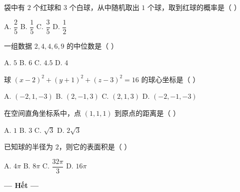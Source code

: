 \documentclass[11pt, a4paper]{article}
\begin{document}
\begin{baitap}[44]
袋中有 $2$ 个红球和 $3$ 个白球，从中随机取出 $1$ 个球，取到红球的概率是（ ）
\par\vspace{3pt}
\noindent A. $\dfrac{2}{5}$ \quad B. $\dfrac{1}{5}$ \quad C. $\dfrac{3}{5}$ \quad D. $\dfrac{1}{2}$
\end{baitap}

\begin{baitap}[45]
一组数据 $2, 4, 4, 6, 9$ 的中位数是（ ）
\par\vspace{3pt}
\noindent A. $5$ \quad B. $6$ \quad C. $4.5$ \quad D. $4$
\end{baitap}

\begin{baitap}[46]
球 $(x - 2)^2 + (y + 1)^2 + (z - 3)^2 = 16$ 的球心坐标是（ ）
\par\vspace{3pt}
\noindent A. $(-2, 1, -3)$ \quad B. $(2, -1, 3)$ \quad C. $(2, 1, 3)$ \quad D. $(-2, -1, -3)$
\end{baitap}

\begin{baitap}[47]
在空间直角坐标系中，点 $(1, 1, 1)$ 到原点的距离是（ ）
\par\vspace{3pt}
\noindent A. $1$ \quad B. $3$ \quad C. $\sqrt{3}$ \quad D. $2\sqrt{3}$
\end{baitap}

\begin{baitap}[48]
已知球的半径为 $2$，则它的表面积是（ ）
\par\vspace{3pt}
\noindent A. $4\pi$ \quad B. $8\pi$ \quad C. $\dfrac{32\pi}{3}$ \quad D. $16\pi$
\end{baitap}

\vspace{0.5cm}
\begin{center}
\textbf{--- Hết ---}
\end{center}
\end{document}
